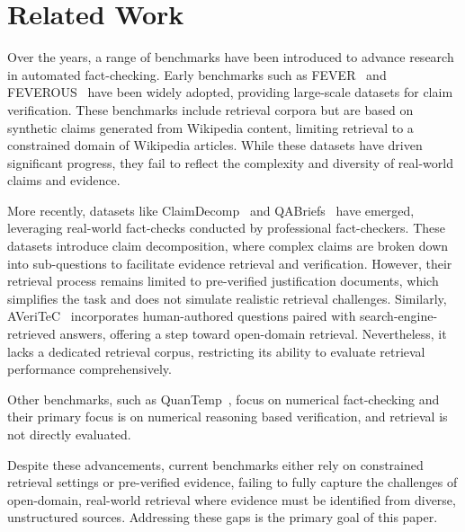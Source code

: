 \section{Related Work}

Over the years, a range of benchmarks have been introduced to advance research in automated fact-checking. Early benchmarks such as FEVER~\cite{thorne-etal-2018-fever} and FEVEROUS~\cite{aly2021feverous} have been widely adopted, providing large-scale datasets for claim verification. These benchmarks include retrieval corpora but are based on synthetic claims generated from Wikipedia content, limiting retrieval to a constrained domain of Wikipedia articles. While these datasets have driven significant progress, they fail to reflect the complexity and diversity of real-world claims and evidence.

More recently, datasets like ClaimDecomp~\cite{claimdecomp} and QABriefs~\cite{QABriefs} have emerged, leveraging real-world fact-checks conducted by professional fact-checkers. These datasets introduce claim decomposition, where complex claims are broken down into sub-questions to facilitate evidence retrieval and verification. However, their retrieval process remains limited to pre-verified justification documents, which simplifies the task and does not simulate realistic retrieval challenges. Similarly, AVeriTeC~\cite{schlichtkrull2023averitec} incorporates human-authored questions paired with search-engine-retrieved answers, offering a step toward open-domain retrieval. Nevertheless, it lacks a dedicated retrieval corpus, restricting its ability to evaluate retrieval performance comprehensively.

Other benchmarks, such as QuanTemp~\cite{10.1145/3626772.3657874}, focus on numerical fact-checking and their primary focus is on numerical reasoning based verification, and retrieval is not directly evaluated. 

Despite these advancements, current benchmarks either rely on constrained retrieval settings or pre-verified evidence, failing to fully capture the challenges of open-domain, real-world retrieval where evidence must be identified from diverse, unstructured sources. Addressing these gaps is the primary goal of this paper.